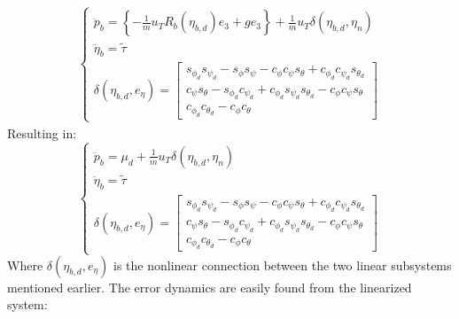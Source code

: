 \begin{gather*}
    \begin{cases}
        \ddot{p}_b=\left\{-\frac{1}{m}u_{T}R_b(\eta_{b,d})e_3+ge_3\right\}+\frac{1}{m}u_{T}\delta(\eta_{b,d},\eta_{n})\\
        \ddot{\eta}_b=\tilde{\tau}\\
        \delta(\eta_{b,d},e_\eta)=
        \begin{bmatrix}
            s_{\phi_d}s_{\psi_d}-s_{\phi}s_{\psi}-c_{\phi}c_{\psi}s_{\theta}+c_{\phi_d}c_{\psi_d}s_{\theta_d}\\
            c_{\psi}s_{\theta}-s_{\phi_d}c_{\psi_d}+c_{\phi_d}s_{\psi_d}s_{\theta_d}-c_{\phi}c_{\psi}s_{\theta}\\
            c_{\phi_d}c_{\theta_d}-c_{\phi}c_{\theta}
        \end{bmatrix}
    \end{cases}
\end{gather*}
Resulting in:
\begin{equation}\label{UAV_hierachical_interconnection_model}
    \begin{cases}
        \ddot{p}_b=\mu_d+\frac{1}{m}u_{T}\delta(\eta_{b,d},\eta_{n})\\
        \ddot{\eta}_b=\tilde{\tau}\\
        \delta(\eta_{b,d},e_\eta)=
        \begin{bmatrix}
            s_{\phi_d}s_{\psi_d}-s_{\phi}s_{\psi}-c_{\phi}c_{\psi}s_{\theta}+c_{\phi_d}c_{\psi_d}s_{\theta_d}\\
            c_{\psi}s_{\theta}-s_{\phi_d}c_{\psi_d}+c_{\phi_d}s_{\psi_d}s_{\theta_d}-c_{\phi}c_{\psi}s_{\theta}\\
            c_{\phi_d}c_{\theta_d}-c_{\phi}c_{\theta}
        \end{bmatrix}
    \end{cases}
\end{equation}
Where $\delta(\eta_{b,d},e_\eta)$ is the nonlinear connection between the two linear subsystems mentioned earlier. The error dynamics are easily found from the linearized system:
